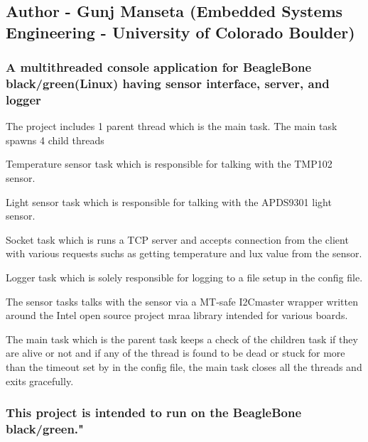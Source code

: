 \subsection*{Author -\/ Gunj Manseta (Embedded Systems Engineering -\/ University of Colorado Boulder)}

\subsubsection*{A multithreaded console application for Beagle\+Bone black/green(Linux) having sensor interface, server, and logger}

The project includes 1 parent thread which is the main task. The main task spawns 4 child threads


\begin{DoxyEnumerate}
\item Temperature sensor task which is responsible for talking with the T\+M\+P102 sensor.
\item Light sensor task which is responsible for talking with the A\+P\+D\+S9301 light sensor.
\item Socket task which is runs a T\+CP server and accepts connection from the client with various requests suchs as getting temperature and lux value from the sensor.
\item Logger task which is solely responsible for logging to a file setup in the config file.
\end{DoxyEnumerate}

The sensor tasks talks with the sensor via a M\+T-\/safe I2\+Cmaster wrapper written around the Intel open source project mraa library intended for various boards.

The main task which is the parent task keeps a check of the children task if they are alive or not and if any of the thread is found to be dead or stuck for more than the timeout set by in the config file, the main task closes all the threads and exits gracefully.

\subsubsection*{This project is intended to run on the Beagle\+Bone black/green."}